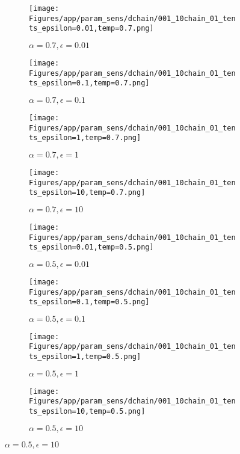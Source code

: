 \documentclass{article}
\theoremstyle{plain}
\begin{document}
\begin{appendices}
\begin{figure}
                \begin{subfigure}[b]{0.24\textwidth}
                    \centering
                    \texttt{[image: Figures/app/param\_sens/dchain/001\_10chain\_01\_tents\_epsilon=0.01,temp=0.7.png]}
                    \caption*{$\alpha=0.7,\epsilon=0.01$}
                \end{subfigure}
                \begin{subfigure}[b]{0.24\textwidth}
                    \centering
                    \texttt{[image: Figures/app/param\_sens/dchain/001\_10chain\_01\_tents\_epsilon=0.1,temp=0.7.png]}
                    \caption*{$\alpha=0.7,\epsilon=0.1$}
                \end{subfigure}
                \begin{subfigure}[b]{0.24\textwidth}
                    \centering
                    \texttt{[image: Figures/app/param\_sens/dchain/001\_10chain\_01\_tents\_epsilon=1,temp=0.7.png]}
                    \caption*{$\alpha=0.7,\epsilon=1$}
                \end{subfigure}
                \begin{subfigure}[b]{0.24\textwidth}
                    \centering
                    \texttt{[image: Figures/app/param\_sens/dchain/001\_10chain\_01\_tents\_epsilon=10,temp=0.7.png]}
                    \caption*{$\alpha=0.7,\epsilon=10$}
                \end{subfigure}
                
                \begin{subfigure}[b]{0.24\textwidth}
                    \centering
                    \texttt{[image: Figures/app/param\_sens/dchain/001\_10chain\_01\_tents\_epsilon=0.01,temp=0.5.png]}
                    \caption*{$\alpha=0.5,\epsilon=0.01$}
                \end{subfigure}
                \begin{subfigure}[b]{0.24\textwidth}
                    \centering
                    \texttt{[image: Figures/app/param\_sens/dchain/001\_10chain\_01\_tents\_epsilon=0.1,temp=0.5.png]}
                    \caption*{$\alpha=0.5,\epsilon=0.1$}
                \end{subfigure}
                \begin{subfigure}[b]{0.24\textwidth}
                    \centering
                    \texttt{[image: Figures/app/param\_sens/dchain/001\_10chain\_01\_tents\_epsilon=1,temp=0.5.png]}
                    \caption*{$\alpha=0.5,\epsilon=1$}
                \end{subfigure}
                \begin{subfigure}[b]{0.24\textwidth}
                    \centering
                    \texttt{[image: Figures/app/param\_sens/dchain/001\_10chain\_01\_tents\_epsilon=10,temp=0.5.png]}
                    \caption*{$\alpha=0.5,\epsilon=10$}
                \end{subfigure}
                

\end{figure}
\end{appendices}
\end{document}
